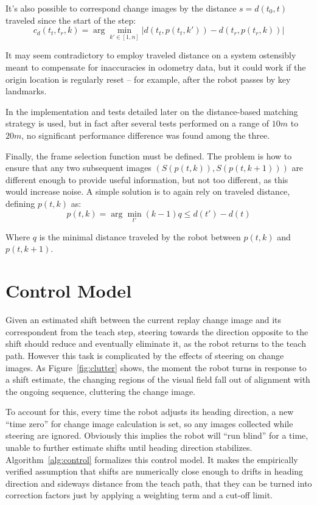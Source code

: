 \documentclass[twocolumn, 9pt,fleqn]{jsproceedings}
\begin{document}
It's also possible to correspond change images by the distance $s = d(t_0, t)$ traveled since the start of the step:
\begin{equation}
c_d(t_t, t_r, k) = \arg \min_{k' \in [1, n]} {| d(t_t, p(t_t, k')) - d(t_r, p(t_r, k)) |}
\end{equation}

It may seem contradictory to employ traveled distance on a system ostensibly meant to compensate for inaccuracies in odometry data, but it could work if the origin location is regularly reset -- for example, after the robot passes by key landmarks.

In the implementation and tests detailed later on the distance-based matching strategy is used, but in fact after several tests performed on a range of $10m$ to $20m$, no significant performance difference was found among the three.

Finally, the frame selection function must be defined. The problem is how to ensure that any two subsequent images $(S(p(t, k)), S(p(t, k+1)))$ are different enough to provide useful information, but not too different, as this would increase noise. A simple solution is to again rely on traveled distance, defining  $p(t, k)$ as:
\begin{equation}
p(t, k) = \arg \min_{t'} {(k - 1)q \leq d(t') - d(t)}
\end{equation}

Where $q$ is the minimal distance traveled by the robot between $p(t, k)$ and $p(t, k+1)$.

\section{Control Model}

Given an estimated shift between the current replay change image and its correspondent from the teach step, steering towards the direction opposite to the shift should reduce and eventually eliminate it, as the robot returns to the teach path. However this task is complicated by the effects of steering on change images. As Figure~\ref{fig:clutter} shows, the moment the robot turns in response to a shift estimate, the changing regions of the visual field fall out of alignment with the ongoing sequence, cluttering the change image.

To account for this, every time the robot adjusts its heading direction, a new ``time zero'' for change image calculation is set, so any images collected while steering are ignored. Obviously this implies the robot will ``run blind'' for a time, unable to further estimate shifts until heading direction stabilizes. Algorithm~\ref{alg:control} formalizes this control model. It makes the empirically verified assumption that shifts are numerically close enough to drifts in heading direction and sideways distance from the teach path, that they can be turned into correction factors just by applying a weighting term and a cut-off limit.
\end{document}
